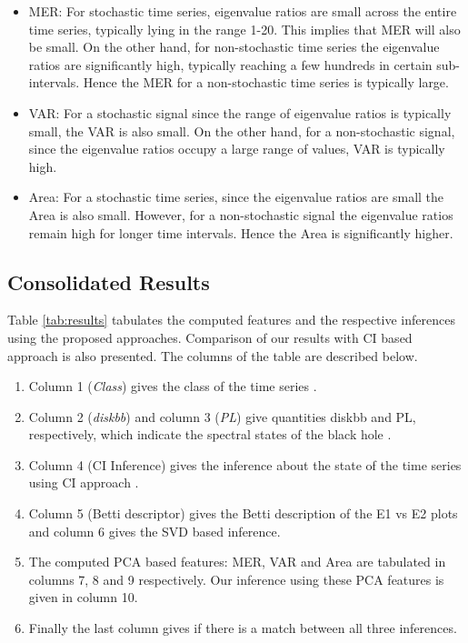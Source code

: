 \documentclass[journal]{IEEEtran}
\begin{document}
\begin{itemize}
\item MER: For stochastic time series, eigenvalue ratios  are small across the entire time series, typically lying in the range 1-20. This implies that MER  will also be small. On the other hand, for  non-stochastic time series the eigenvalue ratios are significantly high, typically reaching a few hundreds in certain sub-intervals. Hence the MER for a non-stochastic time series is typically large.
\item VAR: For a stochastic signal since the range of eigenvalue ratios is typically small, the VAR is also small. On the other hand, for a non-stochastic signal, since the eigenvalue ratios occupy a large range of values, VAR is typically high.
\item Area: For a stochastic time series, since the eigenvalue ratios  are small the Area is also small. However, for a non-stochastic signal the eigenvalue ratios remain high for longer time intervals. Hence the Area is significantly higher.
\end{itemize}

\subsection{Consolidated Results}

Table \ref{tab:results}  tabulates the computed features and the respective inferences using the proposed approaches. Comparison of our results with CI based approach \cite{Adegoke2018} is also presented. The columns of the table are described below.

\begin{enumerate}
\item Column 1 (\textit{Class}) gives the class of the time series \cite{Adegoke2018}.
\item Column 2 (\textit{diskbb}) and column 3 (\textit{PL}) give quantities diskbb and  PL, respectively, which indicate the spectral states of the black hole \cite{Adegoke2018}.
\item Column 4 (CI Inference) gives the inference about the state of the time series using CI approach \cite{Adegoke2018}.
\item Column 5 (Betti descriptor) gives the Betti description of the E1 vs E2 plots and column 6 gives the SVD based inference.
\item The computed PCA based features: MER, VAR and Area  are tabulated in columns 7, 8 and 9 respectively. Our inference using these PCA features is given in column 10.
\item Finally the last column gives if there is a match between all three inferences.
\end{enumerate}
\end{document}
